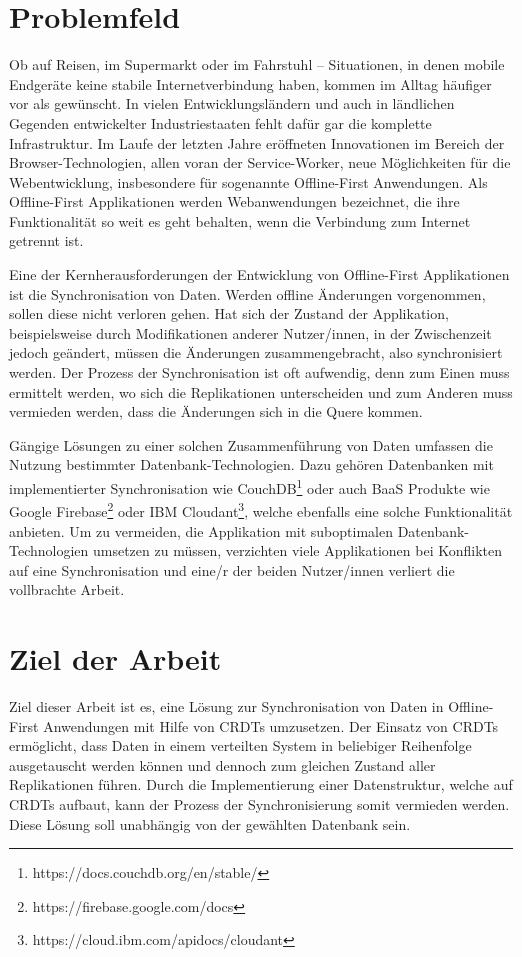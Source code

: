 \documentclass[a4paper, 12pt]{scrreprt}
\begin{document}
\section{Problemfeld}\label{sec:Problemfeld}

Ob auf Reisen, im Supermarkt oder im Fahrstuhl -- Situationen, in denen mobile Endgeräte keine stabile Internetverbindung haben, kommen im Alltag häufiger vor als gewünscht. In vielen Entwicklungsländern und auch in ländlichen Gegenden entwickelter Industriestaaten fehlt dafür gar die komplette Infrastruktur. Im Laufe der letzten Jahre eröffneten Innovationen im Bereich der Browser-Technologien, allen voran der Service-Worker, neue Möglichkeiten für die Webentwicklung, insbesondere für sogenannte Offline-First Anwendungen. Als Offline-First Applikationen werden Webanwendungen bezeichnet, die ihre Funktionalität so weit es geht behalten, wenn die Verbindung zum Internet getrennt ist.

Eine der Kernherausforderungen der Entwicklung von Offline-First Applikationen ist die Synchronisation von Daten. Werden offline Änderungen vorgenommen, sollen diese nicht verloren gehen. Hat sich der Zustand der Applikation, beispielsweise durch Modifikationen anderer Nutzer/innen, in der Zwischenzeit jedoch geändert, müssen die Änderungen zusammengebracht, also synchronisiert werden. Der Prozess der Synchronisation ist oft aufwendig, denn zum Einen muss ermittelt werden, wo sich die Replikationen unterscheiden und zum Anderen muss vermieden werden, dass die Änderungen sich in die Quere kommen. 

Gängige Lösungen zu einer solchen Zusammenführung von Daten umfassen die Nutzung bestimmter Datenbank-Technologien. Dazu gehören Datenbanken mit implementierter Synchronisation wie CouchDB\footnote{https://docs.couchdb.org/en/stable/} oder auch \ac{BaaS} Produkte wie Google Firebase\footnote{https://firebase.google.com/docs} oder IBM Cloudant\footnote{https://cloud.ibm.com/apidocs/cloudant}, welche ebenfalls eine solche Funktionalität anbieten. Um zu vermeiden, die Applikation mit suboptimalen Datenbank-Technologien umsetzen zu müssen, verzichten viele Applikationen bei Konflikten auf eine Synchronisation und eine/r der beiden Nutzer/innen verliert die vollbrachte Arbeit.

\section{Ziel der Arbeit} 
\label{sec:zieleDerArbeit}
Ziel dieser Arbeit ist es, eine Lösung zur Synchronisation von Daten in Offline-First Anwendungen mit Hilfe von \acp{CRDT} umzusetzen. Der Einsatz von \acp{CRDT} ermöglicht, dass Daten in einem verteilten System in beliebiger Reihenfolge ausgetauscht werden können und dennoch zum gleichen Zustand aller Replikationen führen. Durch die Implementierung einer Datenstruktur, welche auf \acp{CRDT} aufbaut, kann der Prozess der Synchronisierung somit vermieden werden. Diese Lösung soll unabhängig von der gewählten Datenbank sein.
\end{document}
